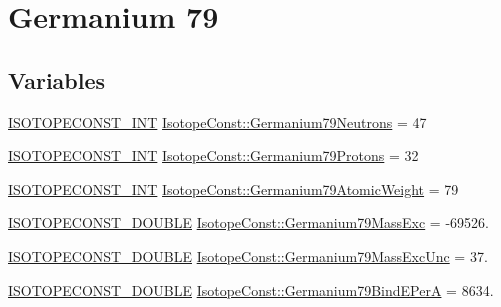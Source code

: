 \hypertarget{group___isotope_const-_germanium-_ge79}{}\section{Germanium 79}
\label{group___isotope_const-_germanium-_ge79}
\subsection*{Variables}
\begin{DoxyCompactItemize}
\item 
\mbox{\hyperlink{group___isotope_const-_macros_ga5f18360b3e99483a35c32d789e62621c}{I\+S\+O\+T\+O\+P\+E\+C\+O\+N\+S\+T\+\_\+\+I\+NT}} \mbox{\hyperlink{group___isotope_const-_germanium-_ge79_ga22b8e7d8656b031c78de29cc0c156f22}{Isotope\+Const\+::\+Germanium79\+Neutrons}} = 47
\item 
\mbox{\hyperlink{group___isotope_const-_macros_ga5f18360b3e99483a35c32d789e62621c}{I\+S\+O\+T\+O\+P\+E\+C\+O\+N\+S\+T\+\_\+\+I\+NT}} \mbox{\hyperlink{group___isotope_const-_germanium-_ge79_ga8e3d19610f8a55af272aa43231f3bb99}{Isotope\+Const\+::\+Germanium79\+Protons}} = 32
\item 
\mbox{\hyperlink{group___isotope_const-_macros_ga5f18360b3e99483a35c32d789e62621c}{I\+S\+O\+T\+O\+P\+E\+C\+O\+N\+S\+T\+\_\+\+I\+NT}} \mbox{\hyperlink{group___isotope_const-_germanium-_ge79_ga61e6b3088c676fc7c197458d8176caa9}{Isotope\+Const\+::\+Germanium79\+Atomic\+Weight}} = 79
\item 
\mbox{\hyperlink{group___isotope_const-_macros_ga8f45a7272ce02c0b4c65c44636ed719a}{I\+S\+O\+T\+O\+P\+E\+C\+O\+N\+S\+T\+\_\+\+D\+O\+U\+B\+LE}} \mbox{\hyperlink{group___isotope_const-_germanium-_ge79_ga2dae3cb03ef908460109fd726fbd8b6c}{Isotope\+Const\+::\+Germanium79\+Mass\+Exc}} = -\/69526.
\item 
\mbox{\hyperlink{group___isotope_const-_macros_ga8f45a7272ce02c0b4c65c44636ed719a}{I\+S\+O\+T\+O\+P\+E\+C\+O\+N\+S\+T\+\_\+\+D\+O\+U\+B\+LE}} \mbox{\hyperlink{group___isotope_const-_germanium-_ge79_ga703b55261e470bbcdedafd44f7f3cd37}{Isotope\+Const\+::\+Germanium79\+Mass\+Exc\+Unc}} = 37.
\item 
\mbox{\hyperlink{group___isotope_const-_macros_ga8f45a7272ce02c0b4c65c44636ed719a}{I\+S\+O\+T\+O\+P\+E\+C\+O\+N\+S\+T\+\_\+\+D\+O\+U\+B\+LE}} \mbox{\hyperlink{group___isotope_const-_germanium-_ge79_ga0169d8ae821f1d787f810e6d0a0e98ce}{Isotope\+Const\+::\+Germanium79\+Bind\+E\+PerA}} = 8634.
\item 

\end{DoxyCompactItemize}
